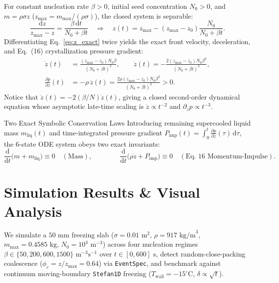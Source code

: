 \documentclass[11pt,a4paper]{article}
\newcommand{\dd}{\mathrm{d}}
\newcommand{\pd}[2]{\frac{\partial #1}{\partial #2}}
\newcommand{\td}[2]{\frac{\dd #1}{\dd #2}}
\begin{document}
For constant nucleation rate $\beta > 0$, initial seed concentration $N_0 > 0$, and $m = \rho\sigma z$ ($z_{\max} = m_{\max}/(\rho\sigma)$), the closed system is separable:
\begin{equation}
  \frac{\dd z}{z_{\max} - z} = \frac{\beta\,\dd t}{N_0 + \beta t}
  \quad\Longrightarrow\quad
  z(t) = z_{\max} - (z_{\max} - z_0)\frac{N_0}{N_0 + \beta t}.
  \label{eq:z_exact}
\end{equation}
Differentiating Eq.~\eqref{eq:z_exact} twice yields the exact front velocity, deceleration, and Eq.~(16) crystallization pressure gradient:
\begin{align}
  \dot{z}(t) &= \frac{(z_{\max} - z_0)N_0\beta}{(N_0 + \beta t)^2},
  \qquad
  \ddot{z}(t) = -\frac{2(z_{\max} - z_0)N_0\beta^2}{(N_0 + \beta t)^3},\\
  \pd{p}{z}(t) &= -\rho\,\ddot{z}(t) = \frac{2\rho(z_{\max}-z_0)N_0\beta^2}{(N_0 + \beta t)^3} > 0.
  \label{eq:kinematics_exact}
\end{align}
Notice that $\ddot{z}(t) = -2(\beta/N)\dot{z}(t)$, giving a closed second-order dynamical equation whose asymptotic late-time scaling is $\dot{z} \propto t^{-2}$ and $\partial_z p \propto t^{-3}$.

\begin{insightbox}{Two Exact Symbolic Conservation Laws}
Introducing remaining supercooled liquid mass $m_{\mathrm{liq}}(t)$ and time-integrated pressure gradient $P_{\mathrm{imp}}(t) = \int_0^t \pd{p}{z}(\tau)\,\dd\tau$, the 6-state ODE system obeys two exact invariants:
\begin{equation}
  \td{}{t}\bigl(m + m_{\mathrm{liq}}\bigr) \equiv 0 \quad (\text{Mass}),
  \qquad\qquad
  \td{}{t}\bigl(\rho\dot{z} + P_{\mathrm{imp}}\bigr) \equiv 0 \quad (\text{Eq.~16 Momentum-Impulse}).
\end{equation}
\end{insightbox}

\section{Simulation Results \& Visual Analysis}

We simulate a $50\text{ mm}$ freezing slab ($\sigma = 0.01\text{ m}^2$, $\rho = 917\text{ kg/m}^3$, $m_{\max} = 0.4585\text{ kg}$, $N_0 = 10^4\text{ m}^{-3}$) across four nucleation regimes $\beta \in \{50, 200, 600, 1500\}\text{ m}^{-3}\text{s}^{-1}$ over $t \in [0, 600]\text{ s}$, detect random-close-packing coalescence ($\phi_c = z/z_{\max} = 0.64$) via \texttt{EventSpec}, and benchmark against continuum moving-boundary \texttt{Stefan1D} freezing ($T_{\mathrm{wall}} = -15^\circ\text{C}$, $\delta \propto \sqrt{t}$).
\end{document}
